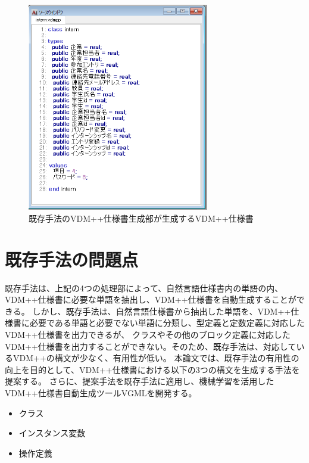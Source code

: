 \begin{figure}[tp]
    \begin{center}
        \includegraphics[width=300]{image/exis_vdm.png}
        \caption{既存手法のVDM++仕様書生成部が生成するVDM++仕様書}
        \label{fig:exis_vdm}
    \end{center}
\end{figure}

\section{既存手法の問題点}
既存手法は、上記の4つの処理部によって、自然言語仕様書内の単語の内、VDM++仕様書に必要な単語を抽出し、VDM++仕様書を自動生成することができる。
しかし、既存手法は、自然言語仕様書から抽出した単語を、VDM++仕様書に必要である単語と必要でない単語に分類し、型定義と定数定義に対応したVDM++仕様書を出力できるが、
クラスやその他のブロック定義に対応したVDM++仕様書を出力することができない。そのため、既存手法は、対応しているVDM++の構文が少なく、有用性が低い。
本論文では、既存手法の有用性の向上を目的として、VDM++仕様書における以下の3つの構文を生成する手法を提案する。
さらに、提案手法を既存手法に適用し、機械学習を活用したVDM++仕様書自動生成ツールVGMLを開発する。

\begin{itemize}
    \item クラス
    \item インスタンス変数
    \item 操作定義
\end{itemize}
